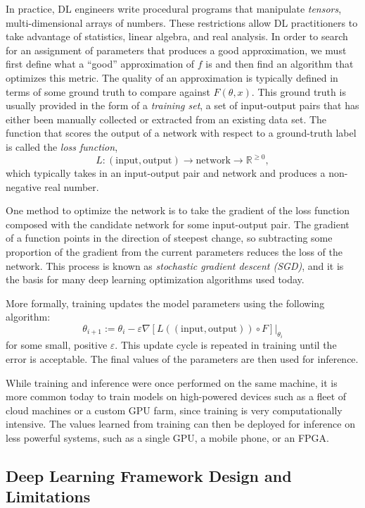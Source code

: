 In practice, DL engineers write procedural programs that manipulate \textit{tensors},
  multi-dimensional arrays of numbers.
These restrictions allow DL practitioners to take advantage of
  statistics, linear algebra, and real analysis.
In order to search for an assignment of parameters that produces a good approximation, we must first
  define what a ``good'' approximation of $f$ is and then find an algorithm that optimizes this metric.
The quality of an approximation is typically defined in terms of some ground truth to
  compare against $F(\theta, x)$.
This ground truth is usually provided in the form of a
\textit{training set}, a set of input-output pairs that has either been manually collected or
  extracted from an existing data set.
The function that scores the output of a network with respect
  to a ground-truth label is called the \textit{loss function},
\[
  L \colon (\text{input}, \text{output}) \to \text{network} \to \mathbb{R}^{\ge 0},
\]
which typically takes in an input-output pair and network and produces a non-negative real
number.

One method to optimize the network is to take the gradient of the loss function composed with the
candidate network for some input-output pair. The gradient of a function points in the direction of
steepest change, so subtracting some proportion of the gradient from the current parameters reduces
the loss of the network. This process is known as \textit{stochastic gradient descent (SGD)}, and it
is the basis for many deep learning optimization algorithms used today.

More formally, training updates the model parameters using the following algorithm:
\[
  \theta_{i+1} := \theta_i - \varepsilon\nabla[L((\text{input}, \text{output})) \circ F]\Big|_{\theta_i}
\]
for some small, positive $\varepsilon$. This update cycle is repeated in training until
the error is acceptable. The final values of the parameters are then used for inference.

While training and inference were once performed on the same machine, it is more common today to
train models on high-powered devices such as a fleet of cloud machines or a custom GPU farm, since
training is very computationally intensive. The values learned from training can then be deployed
for inference on less powerful systems, such as a single GPU, a mobile phone, or an FPGA.

\subsection{Deep Learning Framework Design and Limitations}

